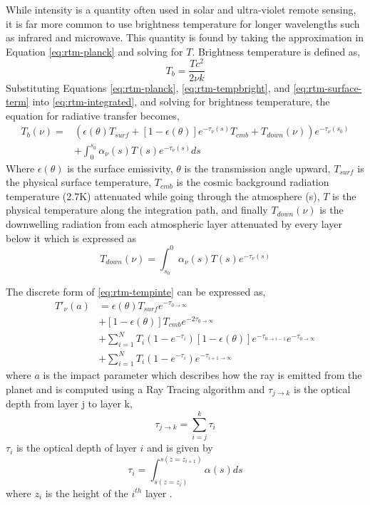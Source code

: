 While intensity is a quantity often used in solar and ultra-violet remote sensing, it is far more common to use brightness temperature for longer wavelengths such as infrared and microwave. This quantity is found by taking the approximation in Equation \ref{eq:rtm-planck} and solving for $T$. Brightness temperature is defined as,
\begin{equation}\label{eq:rtm-tempbright}
T_b = \frac{Tc^2}{2\nu k}
\end{equation}
Substituting Equations \ref{eq:rtm-planck}, \ref{eq:rtm-tempbright}, and \ref{eq:rtm-surface-term} into \ref{eq:rtm-integrated}, and solving for brightness temperature, the equation for radiative transfer becomes, 
\begin{equation}\label{eq:rtm-tempinte}
\begin{split}
T_b(\nu) = &\left(\epsilon(\theta)T_{surf} + [1-\epsilon(\theta)]e^{-\tau_\nu(s)}T_{cmb}+ T_{down}(\nu)\right)e^{-\tau_\nu(s_0)}\\
&+\int_0^{s_0} \alpha_\nu(s)T(s) e^{-\tau_\nu(s)}ds
\end{split}
\end{equation}
Where $\epsilon(\theta)$ is the surface emissivity, $\theta$ is the transmission angle upward, $T_{surf}$ is the physical surface temperature, $T_{cmb}$ is the cosmic background radiation temperature (2.7K) attenuated while going through the atmosphere (s), $T$ is the physical temperature along the integration path, and finally $T_{down}(\nu)$ is the downwelling radiation from each atmospheric layer attenuated by every layer below it which is expressed as
\begin{equation}
T_{down}(\nu) = \int_{s_0}^{0} \alpha_\nu(s)T(s) e^{-\tau_\nu(s)}
\end{equation}  

The discrete form of \ref{eq:rtm-tempinte} can be expressed as,
\begin{equation}\label{eq:rtm-layers}
\begin{split}
T'_\nu(a) &= \epsilon(\theta)T_{surf} e^{-\tau_{0\rightarrow \infty}} \\
&+ [1-\epsilon(\theta)]T_{cmb}e^{-2\tau_{0\rightarrow\infty}}\\
&+ \sum_{i=1}^N T_i(1-e^{-\tau_i})[1-\epsilon(\theta)] e^{-\tau_{0\rightarrow i-1}} e^{-\tau_{0\rightarrow \infty}}\\
&+ \sum_{i=1}^N T_i(1-e^{-\tau_i}) e^{-\tau_{i+1\rightarrow \infty}} 
\end{split}
\end{equation}
where $a$ is the impact parameter which describes how the ray is emitted from the planet and is computed using a Ray Tracing algorithm and $\tau_{j\rightarrow k}$ is the optical depth from layer j to layer k, 
\begin{equation}\label{eq:rtm-layersum}
\tau_{j\rightarrow k} = \sum_{i=j}^k \tau_i
\end{equation}
$\tau_i$ is the optical depth of layer $i$ and is given by
\begin{equation}\label{eq:rtm-layerdepth}
\tau_i = \int_{s(z=z_i)}^{s(z=z_{i+1})} \alpha(s) ds
\end{equation}
where $z_i$ is the height of the $i^{th}$ layer \cite{Jenkins-2002}. 


